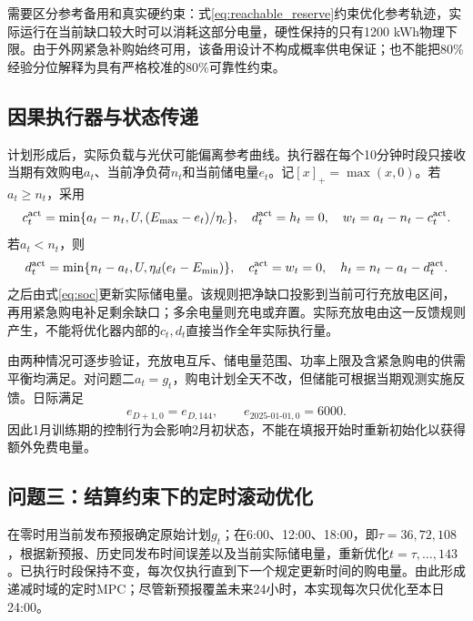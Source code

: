 需要区分参考备用和真实硬约束：式\eqref{eq:reachable_reserve}约束优化参考轨迹，实际运行在当前缺口较大时可以消耗这部分电量，硬性保持的只有1200 kWh物理下限。由于外网紧急补购始终可用，该备用设计不构成概率供电保证；也不能把80\%经验分位解释为具有严格校准的80\%可靠性约束。

\subsection{因果执行器与状态传递}

计划形成后，实际负载与光伏可能偏离参考曲线。执行器在每个10分钟时段只接收当期有效购电$a_t$、当前净负荷$n_t$和当前储电量$e_t$。记$[x]_+=\max(x,0)$。若$a_t\ge n_t$，采用
\begin{equation}
 c_t^{\rm act}=\min\{a_t-n_t,U,(E_{\max}-e_t)/\eta_c\},\quad
 d_t^{\rm act}=h_t=0,\quad w_t=a_t-n_t-c_t^{\rm act}.
 \label{eq:execute_charge}
\end{equation}
若$a_t<n_t$，则
\begin{equation}
 d_t^{\rm act}=\min\{n_t-a_t,U,\eta_d(e_t-E_{\min})\},\quad
 c_t^{\rm act}=w_t=0,\quad h_t=n_t-a_t-d_t^{\rm act}.
 \label{eq:execute_discharge}
\end{equation}
之后由式\eqref{eq:soc}更新实际储电量。该规则把净缺口投影到当前可行充放电区间，再用紧急购电补足剩余缺口；多余电量则充电或弃置。实际充放电由这一反馈规则产生，不能将优化器内部的$c_t,d_t$直接当作全年实际执行量。

由两种情况可逐步验证，充放电互斥、储电量范围、功率上限及含紧急购电的供需平衡均满足。对问题二$a_t=g_t$，购电计划全天不改，但储能可根据当期观测实施反馈。日际满足
\begin{equation}
 e_{D+1,0}=e_{D,144},
 \qquad e_{2025\text{-}01\text{-}01,0}=6000.
\end{equation}
因此1月训练期的控制行为会影响2月初状态，不能在填报开始时重新初始化以获得额外免费电量。

\subsection{问题三：结算约束下的定时滚动优化}

在零时用当前发布预报确定原始计划$g_t$；在6:00、12:00、18:00，即$\tau=36,72,108$，根据新预报、历史同发布时间误差以及当前实际储电量，重新优化$t=\tau,\ldots,143$。已执行时段保持不变，每次仅执行直到下一个规定更新时间的购电量。由此形成递减时域的定时MPC；尽管新预报覆盖未来24小时，本实现每次只优化至本日24:00。

